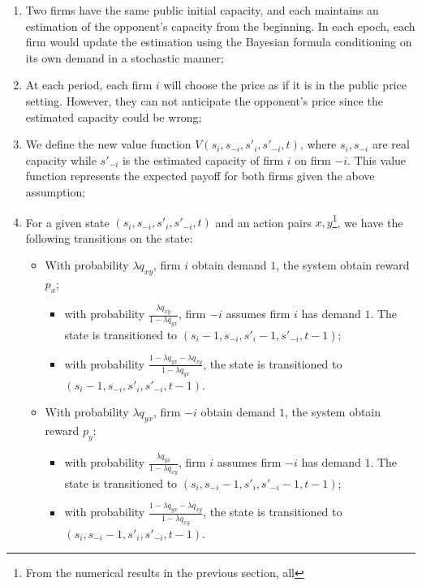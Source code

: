 \documentclass[12pt,letterpaper]{article}
\begin{document}
\begin{enumerate}
    \item Two firms have the same public initial capacity, and each maintains an estimation of the opponent's capacity from the beginning. In each epoch, each firm would update the estimation using the Bayesian formula conditioning on its own demand in a stochastic manner;
    \item At each period, each firm $i$ will choose the price as if it is in the public price setting. However, they can not anticipate the opponent's price since the estimated capacity could be wrong;
    \item We define the new value function $V(s_i,s_{-i},s'_i,s'_{-i},t)$, where $s_i,s_{-i}$ are real capacity while $s'_{-i}$ is the estimated capacity of firm $i$ on firm $-i$. This value function represents the expected payoff for both firms given the above assumption;
    \item For a given state $(s_i,s_{-i},s'_i,s'_{-i},t)$ and an action pairs $x, y$\footnote{From the numerical results in the previous section, all}, we have the following transitions on the state:
    \begin{itemize}
        \item With probability $\lambda q_{xy}$, firm $i$ obtain demand $1$, the system obtain reward $p_x$;
            \begin{itemize}
                \item with probability $\frac{\lambda q_{xy}}{1-\lambda q_{yx}}$, firm $-i$ assumes firm $i$ has demand $1$. The state is transitioned to $(s_i-1,s_{-i},s'_i-1,s'_{-i},t-1)$;
                \item with probability $\frac{1-\lambda q_{yx}-\lambda q_{xy}}{1-\lambda q_{yx}}$, the state is transitioned to $(s_i-1,s_{-i},s'_i,s'_{-i},t-1)$.
            \end{itemize}
        \item With probability $\lambda q_{yx}$, firm $-i$ obtain demand $1$, the system obtain reward $p_y$;
            \begin{itemize}
                \item with probability $\frac{\lambda q_{yx}}{1-\lambda q_{xy}}$, firm $i$ assumes firm $-i$ has demand $1$. The state is transitioned to $(s_i,s_{-i}-1,s'_i,s'_{-i}-1,t-1)$;
                \item with probability $\frac{1-\lambda q_{yx}-\lambda q_{xy}}{1-\lambda q_{xy}}$, the state is transitioned to $(s_i,s_{-i}-1,s'_i,s'_{-i},t-1)$.
            \end{itemize}

\end{itemize}
\end{enumerate}
\end{document}
